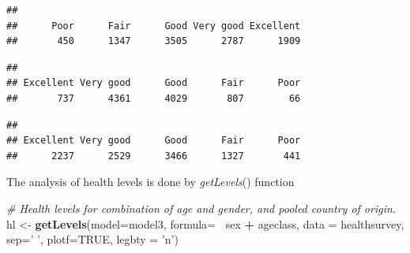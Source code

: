 \documentclass[]{article}
\newenvironment{Shaded}{\begin{snugshade}}{\end{snugshade}}
\newcommand{\CommentTok}[1]{\textcolor[rgb]{0.56,0.35,0.01}{\textit{#1}}}
\newcommand{\DataTypeTok}[1]{\textcolor[rgb]{0.13,0.29,0.53}{#1}}
\newcommand{\KeywordTok}[1]{\textcolor[rgb]{0.13,0.29,0.53}{\textbf{#1}}}
\newcommand{\NormalTok}[1]{#1}
\newcommand{\OperatorTok}[1]{\textcolor[rgb]{0.81,0.36,0.00}{\textbf{#1}}}
\newcommand{\OtherTok}[1]{\textcolor[rgb]{0.56,0.35,0.01}{#1}}
\newcommand{\StringTok}[1]{\textcolor[rgb]{0.31,0.60,0.02}{#1}}
\begin{document}
\begin{verbatim}
## 
##      Poor      Fair      Good Very good Excellent 
##       450      1347      3505      2787      1909
\end{verbatim}

\begin{Shaded}
\end{Shaded}

\begin{verbatim}
## 
## Excellent Very good      Good      Fair      Poor 
##       737      4361      4029       807        66
\end{verbatim}

\begin{Shaded}
\end{Shaded}

\begin{verbatim}
## 
## Excellent Very good      Good      Fair      Poor 
##      2237      2529      3466      1327       441
\end{verbatim}

The analysis of health levels is done by \emph{getLevels}() function

\begin{Shaded}
\begin{Highlighting}[]
\CommentTok{# Health levels for combination of age and gender, and pooled country of origin.}
\NormalTok{hl <-}\StringTok{ }\KeywordTok{getLevels}\NormalTok{(}\DataTypeTok{model=}\NormalTok{model3, }\DataTypeTok{formula=}\OperatorTok{~}\StringTok{ }\NormalTok{sex }\OperatorTok{+}\StringTok{ }\NormalTok{ageclass, }\DataTypeTok{data =}\NormalTok{ healthsurvey, }
                      \DataTypeTok{sep=}\StringTok{' '}\NormalTok{, }\DataTypeTok{plotf=}\OtherTok{TRUE}\NormalTok{, }\DataTypeTok{legbty =} \StringTok{'n'}\NormalTok{)}
\end{Highlighting}
\end{Shaded}
\end{document}
